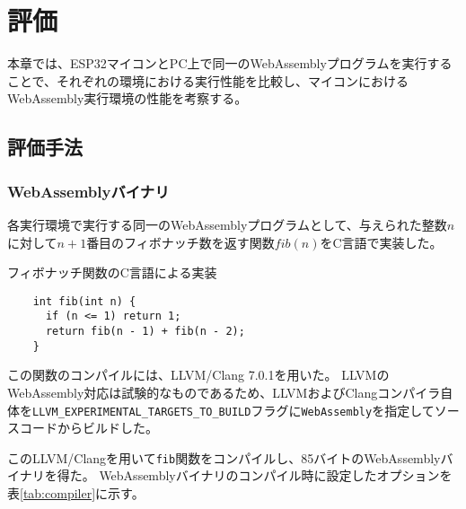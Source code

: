 \chapter{評価}
\label{chap:evaluation}

本章では、ESP32マイコンとPC上で同一のWebAssemblyプログラムを実行することで、それぞれの環境における実行性能を比較し、マイコンにおけるWebAssembly実行環境の性能を考察する。

\section{評価手法}

\subsection{WebAssemblyバイナリ}
\label{subsec:wasm}

各実行環境で実行する同一のWebAssemblyプログラムとして、与えられた整数$n$に対して$n+1$番目のフィボナッチ数を返す関数$fib(n)$をC言語で実装した。

\begin{itembox}[l]{フィボナッチ関数のC言語による実装}
  \begin{verbatim}
    int fib(int n) {
      if (n <= 1) return 1;
      return fib(n - 1) + fib(n - 2);
    }
  \end{verbatim}
\end{itembox}

この関数のコンパイルには、LLVM/Clang 7.0.1を用いた。
LLVMのWebAssembly対応は試験的なものであるため、LLVMおよびClangコンパイラ自体を{\tt LLVM\_EXPERIMENTAL\_TARGETS\_TO\_BUILD}フラグに{\tt WebAssembly}を指定してソースコードからビルドした。

このLLVM/Clangを用いて{\tt fib}関数をコンパイルし、85バイトのWebAssemblyバイナリを得た。
WebAssemblyバイナリのコンパイル時に設定したオプションを表\ref{tab:compiler}に示す。

